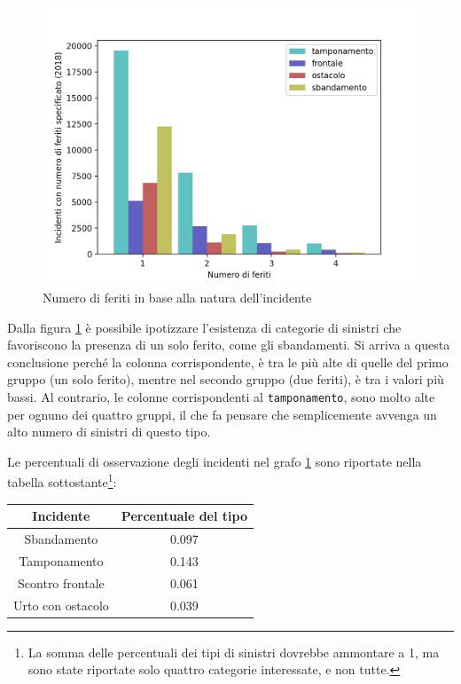 \documentclass[a4paper,12pt]{report}
\newcommand{\columnstyle}[1]{\texttt{#1}}
\begin{document}
\begin{figure}
    \includegraphics[width=\linewidth]{../src/incidenti/incidenti_senza_coords/natura_incidente/natura_incidente.png}
    \caption{Numero di feriti in base alla natura dell'incidente}
    \label{fig:numero-feriti}
\end{figure}

Dalla figura \ref{fig:numero-feriti} è possibile ipotizzare l'esistenza di categorie 
di sinistri che favoriscono la presenza di un solo ferito, come gli sbandamenti. 
Si arriva a questa conclusione perché la colonna corrispondente, è tra 
le più alte di quelle del primo gruppo (un solo ferito), 
mentre nel secondo gruppo (due feriti), è tra i valori più bassi. 
Al contrario, le colonne corrispondenti al \columnstyle{tamponamento}, sono molto alte 
per ognuno dei quattro gruppi, il che fa pensare che semplicemente avvenga un alto numero 
di sinistri di questo tipo. 

Le percentuali di osservazione degli incidenti nel grafo \ref{fig:numero-feriti} sono 
riportate nella tabella sottostante\footnote{La somma delle percentuali dei tipi di 
sinistri dovrebbe ammontare a 1, ma sono state riportate solo quattro categorie 
interessate, e non tutte.}: 

\begin{center}
    \def\arraystretch{1.5}%
    \begin{tabular}{ |c|c| } 
    \hline
    Incidente & Percentuale del tipo \\ 
    \hline
    \rowcolor{TableGray}
    Sbandamento       & 0.097 \\
    Tamponamento      & 0.143 \\
    \rowcolor{TableGray}
    Scontro frontale  & 0.061 \\
    Urto con ostacolo & 0.039 \\
    \hline
    \end{tabular}
\end{center}
\end{document}
